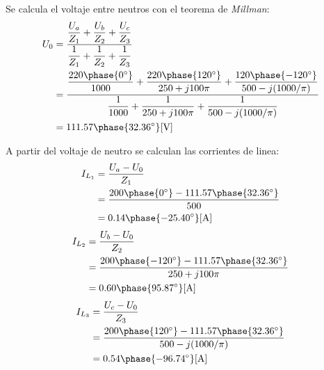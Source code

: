 \documentclass[letter,11pt]{article}
\begin{document}
Se calcula el voltaje entre neutros con el teorema de \emph{Millman}:
\begin{equation*}
    \begin{split}
        U_0 &= \dfrac{
                   \dfrac{U_a}{Z_1}+\dfrac{U_b}{Z_2}+\dfrac{U_c}{Z_3}
               }{
                   \dfrac{1}{Z_1}+\dfrac{1}{Z_2}+\dfrac{1}{Z_3}
               }\\
            &= \dfrac{
                   \dfrac{220\phase{0^{\circ}}}{1000}+
                   \dfrac{220\phase{120^{\circ}}}{250+j100\pi}+
                   \dfrac{120\phase{-120^{\circ}}}{500-j(1000/\pi)}
               }{
                   \dfrac{1}{1000}+
                   \dfrac{1}{250+j100\pi}+
                   \dfrac{1}{500-j(1000/\pi)}
               }\\
            &= 111.57\phase{32.36^{\circ}}[\text{V}]\\
    \end{split}
\end{equation*}

A partir del voltaje de neutro se calculan las corrientes de linea:
\begin{equation*}
    \begin{split}
        I_{L_1} &= \frac{U_a - U_0}{Z_1}\\
                &= \frac{200\phase{0^{\circ}}-111.57\phase{32.36^{\circ}}}{500}\\
                &= 0.14\phase{-25.40^{\circ}}[\text{A}]\\
    \end{split}
\end{equation*}
\begin{equation*}
    \begin{split}
        I_{L_2} &= \frac{U_b - U_0}{Z_2}\\
                &= \frac{200\phase{-120^{\circ}}-111.57\phase{32.36^{\circ}}}{250+j100\pi}\\
                &= 0.60\phase{95.87^{\circ}}[\text{A}]\\
    \end{split}
\end{equation*}
\begin{equation*}
    \begin{split}
        I_{L_3} &= \frac{U_c - U_0}{Z_3}\\
                &= \frac{200\phase{120^{\circ}}-111.57\phase{32.36^{\circ}}}{500-j(1000/\pi)}\\
                &= 0.54\phase{-96.74^{\circ}}[\text{A}]\\
    \end{split}
\end{equation*}
\\
\end{document}
